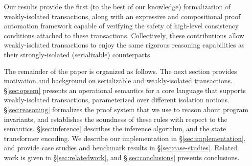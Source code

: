 \noindent Our results provide the first (to the best of our knowledge)
formalization of weakly-isolated transactions, along with an
expressive and compositional proof automation framework capable of
verifying the safety of high-level consistency conditions attached to
these transactions.  Collectively, these contributions allow
weakly-isolated transactions to enjoy the same rigorous reasoning
capabilities as their strongly-isolated (serializable) counterparts.

The remainder of the paper is organized as follows. The next section
provides motivation and background on serializable and weakly-isolated
transactions. \S\ref{sec:opsem} presents an operational semantics for
a core language that supports weakly-isolated transactions,
parameterized over different isolation notions. \S\ref{sec:reasoning}
formalizes the proof system that we use to reason about program
invariants, and establishes the soundness of these rules with respect
to the semantics. \S\ref{sec:inference} describes the inference
algorithm, and the state transformer encoding.  We describe our
implementation in \S\ref{sec:implementation}, and provide case studies
and benchmark results in \S\ref{sec:case-studies}.  Related work is
given in \S\ref{sec:relatedwork}, and \S\ref{sec:conclusions} presents
conclusions.
